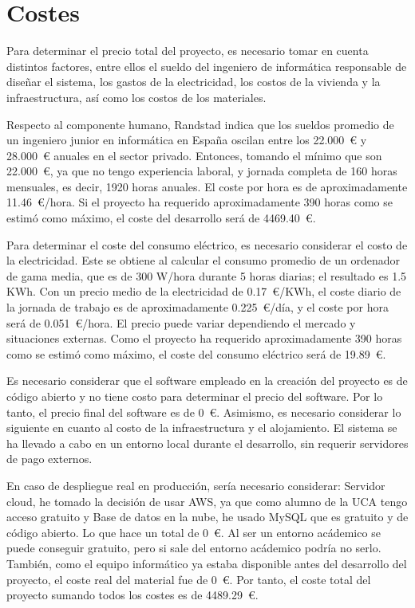 \documentclass[12pt,a4paper]{report}
\begin{document}
\section{Costes}

Para determinar el precio total del proyecto, es necesario tomar en cuenta distintos factores, entre ellos el sueldo del ingeniero de informática responsable de diseñar el sistema, los gastos de la electricidad, los costos de la vivienda y la infraestructura, así como los costos de los materiales.

Respecto al componente humano, Randstad \cite{randstad} indica que los sueldos promedio de un ingeniero junior en informática en España oscilan entre los 22.000~\euro{} y 28.000~\euro{} anuales en el sector privado. Entonces, tomando el mínimo que son 22.000~\euro, ya que no tengo experiencia laboral, y jornada completa de 160 horas mensuales, es decir, 1920 horas anuales. El coste por hora es de aproximadamente 11.46~\euro/hora. Si el proyecto ha requerido aproximadamente 390 horas como se estimó como máximo, el coste del desarrollo será de 4469.40~\euro.

Para determinar el coste del consumo eléctrico, es necesario considerar el costo de la electricidad. Este se obtiene al calcular el consumo promedio de un ordenador de gama media, que es de 300 W/hora durante 5 horas diarias; el resultado es 1.5 KWh. Con un precio medio de la electricidad de 0.17~\euro/KWh, el coste diario de la jornada de trabajo es de aproximadamente 0.225~\euro/día, y el coste por hora será de 0.051~\euro/hora. El precio puede variar dependiendo el mercado y situaciones externas. Como el proyecto ha requerido aproximadamente 390 horas como se estimó como máximo, el coste del consumo eléctrico será de 19.89~\euro.

Es necesario considerar que el software empleado en la creación del proyecto es de código abierto y no tiene costo para determinar el precio del software. Por lo tanto, el precio final del software es de 0~\euro. Asimismo, es necesario considerar lo siguiente en cuanto al costo de la infraestructura y el alojamiento. El sistema se ha llevado a cabo en un entorno local durante el desarrollo, sin requerir servidores de pago externos.

En caso de despliegue real en producción, sería necesario considerar: Servidor cloud, he tomado la decisión de usar AWS, ya que como alumno de la UCA tengo acceso gratuito y Base de datos en la nube, he usado MySQL que es gratuito y de código abierto. Lo que hace un total de 0~\euro. Al ser un entorno acádemico se puede conseguir gratuito, pero si sale del entorno acádemico podría no serlo. También, como el equipo informático ya estaba disponible antes del desarrollo del proyecto, el coste real del material fue de 0~\euro. Por tanto, el coste total del proyecto sumando todos los costes es de 4489.29~\euro.
\end{document}
